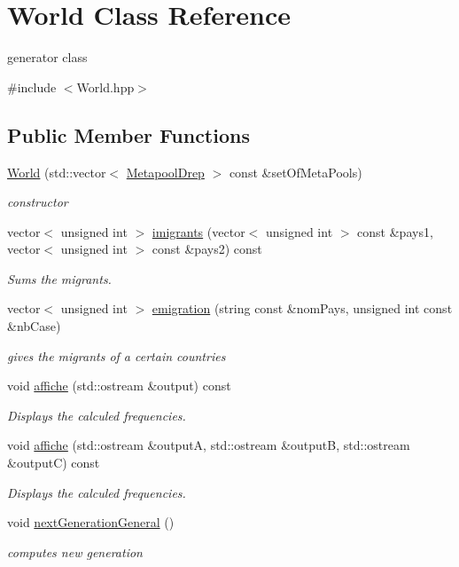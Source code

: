 \hypertarget{class_world}{}\section{World Class Reference}
\label{class_world}


generator class  




{\ttfamily \#include $<$World.\+hpp$>$}

\subsection*{Public Member Functions}
\begin{DoxyCompactItemize}
\item 
\hyperlink{class_world_aed1cdfa4b09eabaacaea9c13bf14e750}{World} (std\+::vector$<$ \hyperlink{class_metapool_drep}{Metapool\+Drep} $>$ const \&set\+Of\+Meta\+Pools)
\begin{DoxyCompactList}\small\item\em constructor \end{DoxyCompactList}\item 
vector$<$ unsigned int $>$ \hyperlink{class_world_a40ce949759360b92a1f6e47224daa2fc}{imigrants} (vector$<$ unsigned int $>$ const \&pays1, vector$<$ unsigned int $>$ const \&pays2) const
\begin{DoxyCompactList}\small\item\em Sums the migrants. \end{DoxyCompactList}\item 
vector$<$ unsigned int $>$ \hyperlink{class_world_ad185335070e7c2590171587204420bd3}{emigration} (string const \&nom\+Pays, unsigned int const \&nb\+Case)
\begin{DoxyCompactList}\small\item\em gives the migrants of a certain countries \end{DoxyCompactList}\item 
void \hyperlink{class_world_a9642cb87f57244d1c864d6e2f1b122dd}{affiche} (std\+::ostream \&output) const
\begin{DoxyCompactList}\small\item\em Displays the calculed frequencies. \end{DoxyCompactList}\item 
void \hyperlink{class_world_ad1fe0da97eb87bea63accfa04527fd6f}{affiche} (std\+::ostream \&outputA, std\+::ostream \&outputB, std\+::ostream \&outputC) const
\begin{DoxyCompactList}\small\item\em Displays the calculed frequencies. \end{DoxyCompactList}\item 
void \hyperlink{class_world_ad3fe092969b31b0e9d5094d2135f4033}{next\+Generation\+General} ()
\begin{DoxyCompactList}\small\item\em computes new generation \end{DoxyCompactList}\end{DoxyCompactItemize}


